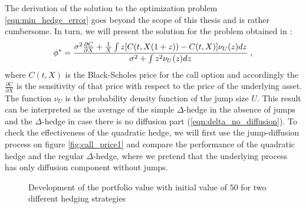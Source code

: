 \documentclass[times, utf8, diplomski]{fer}
\begin{document}
\noindent The derivation of the solution to the optimization problem \ref{eqn:min_hedge_error} goes beyond the scope of this thesis and is rather cumbersome. In turn, we will present the solution for the problem obtained in \cite{cont_financial_2004}:
\begin{equation} \label{eqn:quadratic_hedge}
	\phi^* = \frac{\sigma^2 \frac{\partial C}{\partial X} + \frac{1}{X} \int z[C(t,X(1+z))-C(t,X)] \nu_U(z)dz}{\sigma^2 + \int z^2 \nu_U(z)dz} \hspace{0.1cm},
\end{equation} where $C(t,X)$ is the Black-Scholes price for the call option and accordingly the $\frac{\partial C}{\partial X}$ is the sensitivity of that price with respect to the price of the underlying asset. The function $\nu_U$ is the probability density function of the jump size $U$. This result can be interpreted as the average of the simple $\Delta$-hedge in the absence of jumps and the $\Delta$-hedge in case there is no diffusion part (\ref{eqn:delta_no_diffusion}). To check the effectiveness of the quadratic hedge, we will first use the jump-diffusion process on figure \ref{fig:call_price1} and compare the performance of the quadratic hedge and the regular $\Delta$-hedge, where we pretend that the underlying process has only diffusion component without jumps. 

\begin{figure}[ht]
\centering

\caption{Development of the portfolio value with initial value of $50$ for two different hedging strategies}
\label{fig:hedging_jump_diffusion}	
\end{figure}
\end{document}
